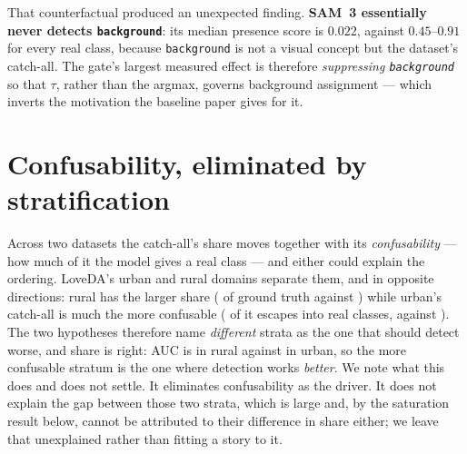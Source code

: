 \documentclass[10pt,a4paper]{article}                        %
\newcommand{\best}[1]{\textbf{#1}}
\newcommand{\bg}{\texttt{background}}
\begin{document}
That counterfactual produced an unexpected finding. \best{SAM~3 essentially never
detects \bg{}}: its median presence score is $0.022$, against $0.45$--$0.91$ for
every real class, because \bg{} is not a visual concept but the dataset's
catch-all. The gate's largest measured effect is therefore \emph{suppressing
\bg{}} so that $\tau$, rather than the argmax, governs background assignment ---
which inverts the motivation the baseline paper gives for it.


\section{Confusability, eliminated by stratification}
\label{sup:confuse}
 Across two datasets the catch-all's
share moves together with its \emph{confusability} --- how much of it the model
gives a real class --- and either could explain the ordering. LoveDA's urban and
rural domains separate them, and in opposite directions: rural has the larger
share (\SHAREr{} of ground truth against \SHAREu{}) while urban's catch-all is
much the more confusable (\CONFu{} of it escapes into real classes, against
\CONFr{}). The two hypotheses therefore name \emph{different} strata as the one
that should detect worse, and share is right: AUC is \AUCr{} in rural against
\AUCu{} in urban, so the more confusable stratum is the one where detection works
\emph{better}. We note what this does and does not settle. It eliminates
confusability as the driver. It does not explain the gap between those two strata,
which is large and, by the saturation result below, cannot be attributed to their
difference in share either; we leave that unexplained rather than fitting a story
to it.
\end{document}
